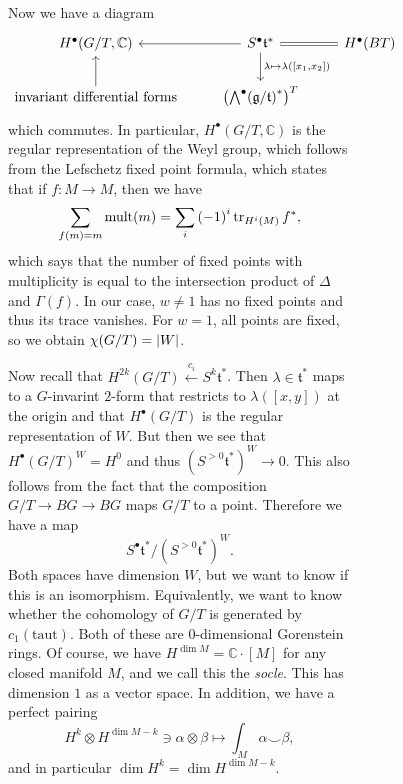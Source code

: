 \documentclass[leqno, openany]{memoir}
\theoremstyle{definition}
\theoremstyle{remark}
\theoremstyle{plain}
\theoremstyle{definition}
\theoremstyle{remark}
\newcommand{\C}{\mathbb{C}}
\newcommand{\mf}[1]{\mathfrak{#1}}
\begin{document}
\begin{figure}[H]
\begin{figure}[H]
Now we have a diagram \begin{equation*} \begin{tikzcd} H^{\bullet}(G/T, \C) &
    S^{\bullet} \mf{t}^* \ar[equal]{r} \ar{l} \ar{d}{\lambda \mapsto
    \lambda([x_1, x_2])} & H^{\bullet}(BT) \\ \text{invariant differential
forms} \ar{u} & {\qty({\bigwedge}^{\bullet}{(\mf{g}/\mf{t})}^*)}^T \end{tikzcd}
\end{equation*} which commutes. In particular, $H^{\bullet}(G/T, \C)$ is the
regular representation of the Weyl group, which follows from the Lefschetz
fixed point formula, which states that if $f \colon M \to M$, then we have \[
\sum_{f(m) = m} \operatorname{mult}(m) = \sum_i {(-1)}^i \tr_{H^i(M)} f^*, \]
which says that the number of fixed points with multiplicity is equal to the
intersection product of $\Delta$ and $\Gamma(f)$. In our case, $w \neq 1$ has
no fixed points and thus its trace vanishes. For $w = 1$, all points are fixed,
so we obtain $\chi(G/T) = \abs{W}$.

Now recall that $H^{2k}(G/T) \xleftarrow{c_i} S^k \mf{t}^*$. Then $\lambda \in
\mf{t}^*$ maps to a $G$-invarint $2$-form that restricts to $\lambda([x,y])$ at
the origin and that $H^{\bullet}(G/T)$ is the regular representation of $W$.
But then we see that ${H^{\bullet}(G/T)}^W = H^0$ and thus ${(S^{>0}
\mf{t}^*)}^W \to 0$. This also follows from the fact that the composition $G/T
\to BG \to BG$ maps $G/T$ to a point. Therefore we have a map \[ S^{\bullet}
\mf{t}^* / {(S^{>0} \mf{t}^*)}^W. \] Both spaces have dimension $W$, but we
want to know if this is an isomorphism. Equivalently, we want to know whether
the cohomology of $G/T$ is generated by $c_1(\text{taut})$. Both of these are
$0$-dimensional Gorenstein rings. Of course, we have $H^{\dim M} = \C \cdot
[M]$ for any closed manifold $M$, and we call this the \textit{socle}. This has
dimension $1$ as a vector space. In addition, we have a perfect pairing \[ H^k
\otimes H^{\dim M - k} \ni \alpha \otimes \beta \mapsto \int_M \alpha \smile
\beta, \] and in particular $\dim H^k = \dim H^{\dim M - k}$. 


\end{figure}
\end{figure}
\end{document}
